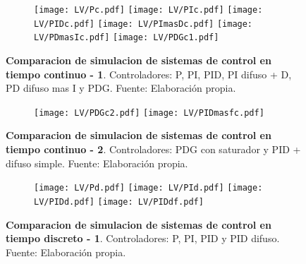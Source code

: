     \begin{figure}[!h]
        \centering
        \begin{subfigure}[t]{0.99\textwidth}
            \centering
            \texttt{[image: LV/Pc.pdf]}
            \texttt{[image: LV/PIc.pdf]}
            \texttt{[image: LV/PIDc.pdf]}
            \texttt{[image: LV/PImasDc.pdf]}
            \texttt{[image: LV/PDmasIc.pdf]}
            \texttt{[image: LV/PDGc1.pdf]}
            \label{fig:simC1}
        \end{subfigure}
        \caption[Comparacion de simulacion de sistemas de control continuos - 1]{\textbf{Comparacion de simulacion de sistemas de control en tiempo continuo - 1}. Controladores: P, PI, PID, PI difuso + D, PD difuso mas I y PDG. Fuente: Elaboración propia. \label{fig:simC1f}}
    \end{figure}

    \begin{figure}[htb]
        \centering
        \begin{subfigure}[t]{0.99\textwidth}
            \centering
            \texttt{[image: LV/PDGc2.pdf]}
            \texttt{[image: LV/PIDmasfc.pdf]}
            \label{fig:simC2}
        \end{subfigure}
        \caption[Comparacion de simulacion de sistemas de control continuos - 2]{\textbf{Comparacion de simulacion de sistemas de control en tiempo continuo - 2}. Controladores: PDG con saturador y PID + difuso simple. Fuente: Elaboración propia. \label{fig:simC2f}}
    \end{figure}

    \begin{figure}[htb]
        \centering
        \begin{subfigure}[t]{0.99\textwidth}
            \centering
            \texttt{[image: LV/Pd.pdf]}
            \texttt{[image: LV/PId.pdf]}
            \texttt{[image: LV/PIDd.pdf]}
            \texttt{[image: LV/PIDdf.pdf]}
            \label{fig:simD1}
        \end{subfigure}
        \caption[Comparacion de simulacion de sistemas de control discretos - 1]{\textbf{Comparacion de simulacion de sistemas de control en tiempo discreto - 1}. Controladores: P, PI, PID y PID difuso. Fuente: Elaboración propia. \label{fig:simD1f}}
    \end{figure}

